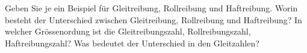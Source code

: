 %
\begin{aufgabe}
	Geben Sie je ein Beispiel für Gleitreibung, Rollreibung und Haftreibung.
	Worin besteht der Unterschied zwischen Gleitreibung, Rollreibung und Haftreibung?
	In welcher Grössenordung ist die Gleitreibungszahl, Rollreibungszahl, Haftreibungszahl?
	Was bedeutet der Unterschied in den Gleitzahlen?
\end{aufgabe}
\begin{loesung}

\end{loesung}
